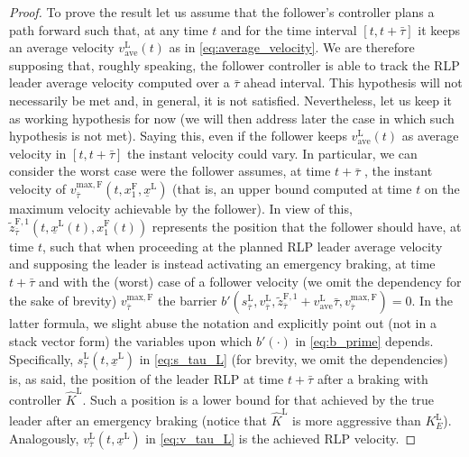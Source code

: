 \documentclass[letterpaper, 10 pt, conference]{ieeeconf}
\theoremstyle{definition}
\theoremstyle{nopoint}
\begin{document}
\begin{proof}
To prove the result let us assume that the follower's controller plans a path forward such that, at any time $t$ and for the time interval $[t, t+\bar{\tau}]$ it keeps an average velocity $v_{\mathrm{ave}}^\mathrm{L}(t)$ as in  \eqref{eq:average_velocity}.
We are therefore supposing that, roughly speaking, the follower controller is able to track the RLP leader average velocity  computed over a $\bar{\tau}$ ahead interval. This hypothesis will not necessarily be met and, in general, it is not satisfied. Nevertheless, let us keep it as working hypothesis for now (we will then address later the case in which such hypothesis is not met).
Saying this, even if the follower keeps $v_{\mathrm{ave}}^\mathrm{L}(t)$ as average velocity in $[t, t+\bar{\tau}]$ the instant velocity could vary. In particular, we can consider the worst case were the follower assumes, at time $t+\bar{\tau}$ , the instant velocity of $v_{\bar{\tau}}^{\mathrm{max}, \mathrm{F}}(t, x_1^\mathrm{F}, \underline{x}^\mathrm{L})$ (that is, an upper bound computed at time $t$ on the maximum velocity achievable by the follower).
In view of this, $\tilde{z}^{\mathrm{F},1}_{\bar{\tau}} (t,\underline{x}^\mathrm{L}(t),x_1^\mathrm{F}(t))$ represents the position that the follower should have, at time $t$, such that when proceeding at the planned RLP leader average velocity and supposing the leader is instead activating an emergency braking, at time $t+\bar{\tau}$ and with the (worst) case of a follower velocity (we omit the dependency for the sake of brevity) $v_{\bar{\tau}}^{\mathrm{max}, \mathrm{F}}$ the barrier $b'(s_{\bar{\tau}}^\mathrm{L},v_{\bar{\tau}}^\mathrm{L},\tilde{z}^{\mathrm{F},1}_{\bar{\tau}}+v_{\mathrm{ave}}^\mathrm{L}\bar{\tau},v_{\bar{\tau}}^{\mathrm{max}, \mathrm{F}})=0$. In the latter formula, we slight abuse the notation and explicitly point out (not in a stack vector form) the variables upon which $b'(\cdot)$ in \eqref{eq:b_prime} depends. Specifically,  $s_{\bar{\tau}}^\mathrm{L}\left( t,\underline{x}^\mathrm{L} \right)$ in \eqref{eq:s_tau_L} (for brevity, we omit the dependencies) is, as said, the position of the leader RLP at time $t+\bar{\tau}$ after a braking with controller $\hat{K}^\mathrm{L}$. Such a position is a lower bound for that achieved by the true leader after an emergency braking (notice that $\hat{K}^\mathrm{L}$ is  more aggressive than $K^\mathrm{L}_E$). Analogously, $v_{\bar{\tau}}^\mathrm{L}\left( t,\underline{x}^\mathrm{L} \right)$  in \eqref{eq:v_tau_L} is the achieved RLP velocity. 


\end{proof}
\end{document}
